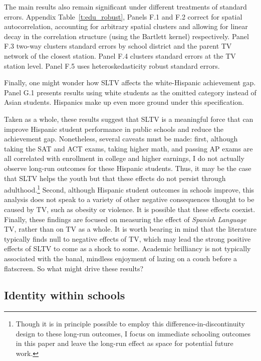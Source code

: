 \documentclass[11pt]{article}
\begin{document}
The main results also remain significant under different treatments of standard errors. Appendix Table~\ref{t:edu_robust}, Panels F.1 and F.2 correct for spatial autocorrelation, accounting for arbitrary spatial clusters and allowing for linear decay in the correlation structure (using the Bartlett kernel) respectively. Panel F.3 two-way clusters standard errors by school district and the parent TV network of the closest station. Panel F.4 clusters standard errors at the TV station level. Panel F.5 uses heteroskedasticity robust standard errors.

Finally, one might wonder how SLTV affects the white-Hispanic achievement gap. Panel G.1 presents results using white students as the omitted category instead of Asian students. Hispanics make up even more ground under this specification.

Taken as a whole, these results suggest that SLTV is a meaningful force that can improve Hispanic student performance in public schools and reduce the achievement gap. Nonetheless, several caveats must be made: first, although taking the SAT and ACT exams, taking higher math, and passing AP exams are all correlated with enrollment in college and higher earnings, I do not actually observe long-run outcomes for these Hispanic students. Thus, it may be the case that SLTV helps the youth but that these effects do not persist through adulthood.\footnote{ Though it is in principle possible to employ this difference-in-discontinuity design to these long-run outcomes, I focus on immediate schooling outcomes in this paper and leave the long-run effect as space for potential future work.} Second, although Hispanic student outcomes in schools improve, this analysis does not speak to a variety of other negative consequences thought to be caused by TV, such as obesity or violence. It is possible that these effects coexist. Finally, these findings are focused on measuring the effect of \textit{Spanish Language} TV, rather than on TV as a whole. It is worth bearing in mind that the literature typically finds null to negative effects of TV, which may lead the strong positive effects of SLTV to come as a shock to some. Academic brilliancy is not typically associated with the banal, mindless enjoyment of lazing on a couch before a flatscreen. So what might drive these results?

\subsection{Identity within schools}
\end{document}
